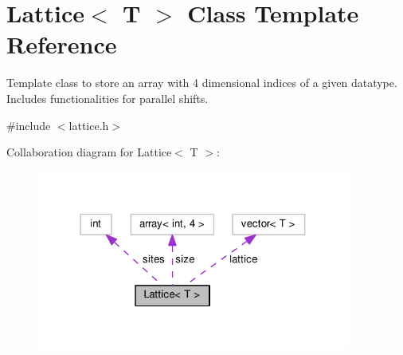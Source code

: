 \hypertarget{classLattice}{}\section{Lattice$<$ T $>$ Class Template Reference}
\label{classLattice}


Template class to store an array with 4 dimensional indices of a given datatype. Includes functionalities for parallel shifts.  




{\ttfamily \#include $<$lattice.\+h$>$}



Collaboration diagram for Lattice$<$ T $>$\+:\nopagebreak
\begin{figure}[H]
\begin{center}
\leavevmode
\includegraphics[width=292pt]{d6/dc1/classLattice__coll__graph}
\end{center}
\end{figure}
